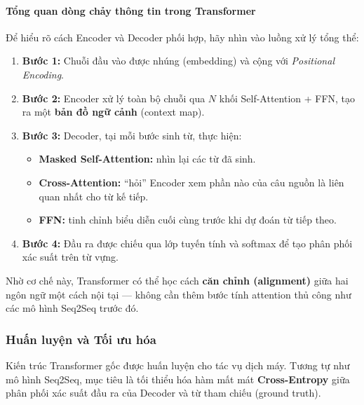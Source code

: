 \paragraph{Tổng quan dòng chảy thông tin trong Transformer}
Để hiểu rõ cách Encoder và Decoder phối hợp, hãy nhìn vào luồng xử lý tổng thể:
\begin{enumerate}
	\item \textbf{Bước 1:} Chuỗi đầu vào được nhúng (embedding) và cộng với \textit{Positional Encoding}.
	\item \textbf{Bước 2:} Encoder xử lý toàn bộ chuỗi qua $N$ khối Self-Attention + FFN, tạo ra một \textbf{bản đồ ngữ cảnh} (context map).
	\item \textbf{Bước 3:} Decoder, tại mỗi bước sinh từ, thực hiện:
	\begin{itemize}
		\item \textbf{Masked Self-Attention:} nhìn lại các từ đã sinh.
		\item \textbf{Cross-Attention:} “hỏi” Encoder xem phần nào của câu nguồn là liên quan nhất cho từ kế tiếp.
		\item \textbf{FFN:} tinh chỉnh biểu diễn cuối cùng trước khi dự đoán từ tiếp theo.
	\end{itemize}
	\item \textbf{Bước 4:} Đầu ra được chiếu qua lớp tuyến tính và softmax để tạo phân phối xác suất trên từ vựng.
\end{enumerate}

Nhờ cơ chế này, Transformer có thể học cách \textbf{căn chỉnh (alignment)} giữa hai ngôn ngữ một cách nội tại — không cần thêm bước tính attention thủ công như các mô hình Seq2Seq trước đó.

\subsubsection{Huấn luyện và Tối ưu hóa}
\label{sssec:transformer_training}
Kiến trúc Transformer gốc được huấn luyện cho tác vụ dịch máy. Tương tự như mô hình Seq2Seq, mục tiêu là tối thiểu hóa hàm mất mát \textbf{Cross-Entropy} giữa phân phối xác suất đầu ra của Decoder và từ tham chiếu (ground truth).

